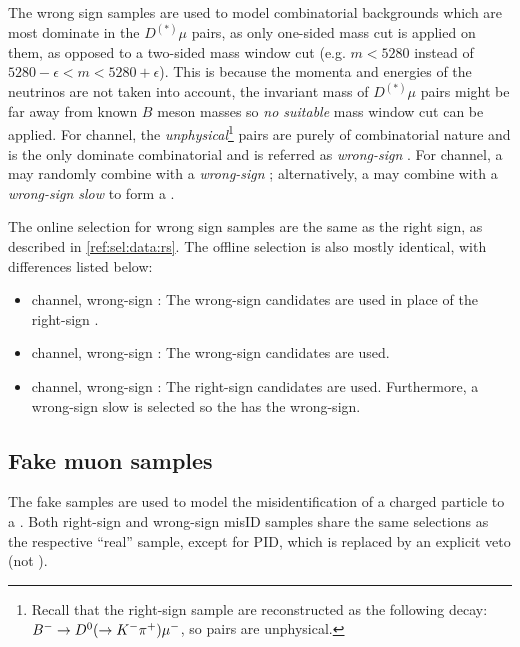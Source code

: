 The wrong sign samples are used to model combinatorial backgrounds which are
most dominate in the $D^{(*)}\mu$ pairs,
as only one-sided mass cut is applied on them, as opposed to a two-sided
mass window cut
(e.g. $m < 5280$ instead of $5280 - \epsilon < m < 5280 + \epsilon$).
This is because the momenta and energies of the neutrinos are not taken into
account,
the invariant mass of $D^{(*)}\mu$ pairs might be far away from known $B$ meson
masses so \emph{no suitable} mass window cut can be applied.
For \Dz channel, the \emph{unphysical}\footnote{
    Recall that the right-sign sample are reconstructed as the following decay:
    ${{{B}^-}} \rightarrow {\ensuremath{{D}^0}} (\rightarrow {\ensuremath{{K}^-}} {\ensuremath{{\pi}^+}}) {\mu^-}$,
    so \Dz\mup pairs are unphysical.
} \Dz\mup pairs are purely of combinatorial
nature and is the only dominate combinatorial and is referred as
\emph{wrong-sign \mu}.
For \Dstar channel, a \Dstarp may randomly combine with a
\emph{wrong-sign \mup}; alternatively, a \Dz may combine with a
\emph{wrong-sign slow \pim} to form a \Dstarm.

The online selection for wrong sign samples are the same as the right sign,
as described in \cref{ref:sel:data:rs}.
The offline selection is also mostly identical, with differences listed below:

\begin{itemize}
    \item \Dz channel, wrong-sign \mu:
        The wrong-sign \Dz\mup candidates are used in place of the right-sign
        \Dz\mun.
    \item \Dstar channel, wrong-sign \mu:
        The wrong-sign \Dz\mup candidates are used.
    \item \Dstar channel, wrong-sign \pi:
        The right-sign \Dz\mun candidates are used.
        Furthermore, a wrong-sign slow \pim is selected so the \Dstar has the
        wrong-sign.
\end{itemize}


\subsection{Fake muon samples}

The fake \muon samples are used to model the misidentification of a charged
particle to a \muon.
Both right-sign and wrong-sign misID samples share the same selections
as the respective ``real'' \muon sample,
except for \muon PID, which is replaced by an explicit \muon veto
(not \isMuon).
